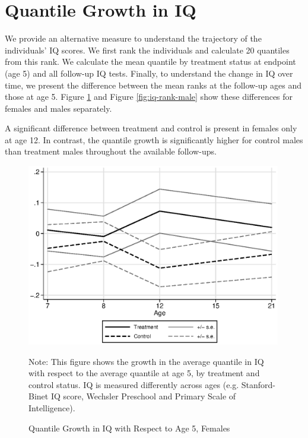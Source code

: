 



\doublespace 
%
%
%



\section{Quantile Growth in IQ}

We provide an alternative measure to understand the trajectory of the individuals' IQ scores. We first rank the individuals and calculate 20 quantiles from this rank. We calculate the mean quantile by treatment status at endpoint (age 5) and all follow-up IQ tests. Finally, to understand the change in IQ over time, we present the difference between the mean ranks at the follow-up ages and those at age 5. Figure \ref{fig:iq-rank-female} and Figure \ref{fig:iq-rank-male} show these differences for females and males separately. 

A significant difference between treatment and control is present in females only at age 12. In contrast, the quantile growth is significantly higher for control males than treatment males throughout the available follow-ups.

\begin{figure}[htbp]
\begin{center}
	\caption{Quantile Growth in IQ with Respect to Age 5, Females} \label{fig:iq-rank-female}
	\includegraphics[width=30em]{output/abccareiqranks_0}
\end{center}
\raggedright \footnotesize
Note: This figure shows the growth in the average quantile in IQ with respect to the average quantile at age 5, by treatment and control status. IQ is measured differently across ages (e.g. Stanford-Binet IQ score, Wechsler Preschool and Primary Scale of Intelligence). 
\end{figure}



